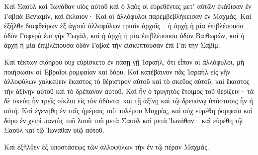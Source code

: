 {Καὶ Σαοὺλ καὶ Ἰωνάθαν υἱὸς αὐτοῦ καὶ ὁ λαὸς οἱ εὑρεθέντες μετʼ αὐτῶν ἐκάθισαν ἐν Γαβαὰ Βενιαμὶν, καὶ ἔκλαιον· Καὶ οἱ ἀλλόφυλοι παρεμβεβλήκεισαν ἐν Μαχμάς.
Καὶ ἐξῆλθε διαφθείρων ἐξ ἀγροῦ ἀλλοφύλων τρισὶν ἀρχαῖς· ἡ ἀρχὴ ἡ μία ἐπιβλέπουσα ὁδὸν Γοφερὰ ἐπὶ γὴν Σωγὰλ,
καὶ ἡ ἀρχὴ ἡ μία ἐπιβλέπουσα ὁδὸν Βαιθωρὼν, καὶ ἡ ἀρχὴ ἡ μία ἐπιβλέπουσα ὁδὸν Γαβαὲ τὴν εἰσκύπτουσαν ἐπὶ Γαὶ τὴν Σαβίμ.
\par }{\PP {}Καὶ τέκτων σιδήρου οὐχ εὑρίσκετο ἐν πάσῃ γῇ Ἰσραὴλ, ὅτι εἶπον οἱ ἀλλόφυλοι, μὴ ποιήσωσιν οἱ Ἑβραῖοι ῥομφαίαν καὶ δόρυ.
Καὶ κατέβαινον πᾶς Ἰσραὴλ εἰς γῆν ἀλλοφύλων χαλκεύειν ἕκαστος τὸ θέριστρον αὐτοῦ καὶ τὸ σκεῦος αὐτοῦ, καὶ ἕκαστος τὴν ἀξίνην αὐτοῦ καὶ τὸ δρέπανον αὐτοῦ.
Καὶ ἦν ὁ τρυγητὸς ἕτοιμος τοῦ θερίζειν· τὰ δὲ σκεύη ἦν τρεῖς σίκλοι εἰς τὸν ὀδόντα, καὶ τῇ ἀξίνῃ καὶ τῷ δρεπάνῳ ὑπόστασις ἦν ἡ αὐτή.
Καὶ ἐγενήθη ἐν ταῖς ἡμέραις τοῦ πολέμου Μαχμὰς, καὶ οὐχ εὑρέθη ῥομφαία καὶ δόρυ ἐν χειρὶ παντὸς τοῦ λαοῦ τοῦ μετὰ Σαοὺλ καὶ μετὰ Ἰωνάθαν· καὶ εὑρέθη τῷ Σαοὺλ καὶ τῷ Ἰωνὰθαν υἱῷ αὐτοῦ.
\par }{\PP {}Καὶ ἐξῆλθεν ἐξ ὑποστάσεως τῶν ἀλλοφύλων τὴν ἐν τῷ πέραν Μαχμάς.

}
